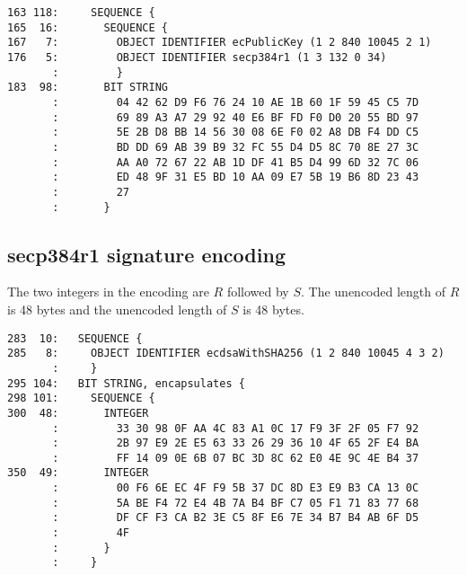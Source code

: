 \documentclass[12pt]{article}
\begin{document}
\begin{verbatim}
163 118:     SEQUENCE {
165  16:       SEQUENCE {
167   7:         OBJECT IDENTIFIER ecPublicKey (1 2 840 10045 2 1)
176   5:         OBJECT IDENTIFIER secp384r1 (1 3 132 0 34)
       :         }
183  98:       BIT STRING
       :         04 42 62 D9 F6 76 24 10 AE 1B 60 1F 59 45 C5 7D
       :         69 89 A3 A7 29 92 40 E6 BF FD F0 D0 20 55 BD 97
       :         5E 2B D8 BB 14 56 30 08 6E F0 02 A8 DB F4 DD C5
       :         BD DD 69 AB 39 B9 32 FC 55 D4 D5 8C 70 8E 27 3C
       :         AA A0 72 67 22 AB 1D DF 41 B5 D4 99 6D 32 7C 06
       :         ED 48 9F 31 E5 BD 10 AA 09 E7 5B 19 B6 8D 23 43
       :         27
       :       }
\end{verbatim}

\subsection*{secp384r1 signature encoding}

\noindent
The two integers in the encoding are $R$ followed by $S$.
The unencoded length of $R$ is 48 bytes and the unencoded length of $S$ is 48 bytes.

\begin{verbatim}
283  10:   SEQUENCE {
285   8:     OBJECT IDENTIFIER ecdsaWithSHA256 (1 2 840 10045 4 3 2)
       :     }
295 104:   BIT STRING, encapsulates {
298 101:     SEQUENCE {
300  48:       INTEGER
       :         33 30 98 0F AA 4C 83 A1 0C 17 F9 3F 2F 05 F7 92
       :         2B 97 E9 2E E5 63 33 26 29 36 10 4F 65 2F E4 BA
       :         FF 14 09 0E 6B 07 BC 3D 8C 62 E0 4E 9C 4E B4 37
350  49:       INTEGER
       :         00 F6 6E EC 4F F9 5B 37 DC 8D E3 E9 B3 CA 13 0C
       :         5A BE F4 72 E4 4B 7A B4 BF C7 05 F1 71 83 77 68
       :         DF CF F3 CA B2 3E C5 8F E6 7E 34 B7 B4 AB 6F D5
       :         4F
       :       }
       :     }
\end{verbatim}
\end{document}
